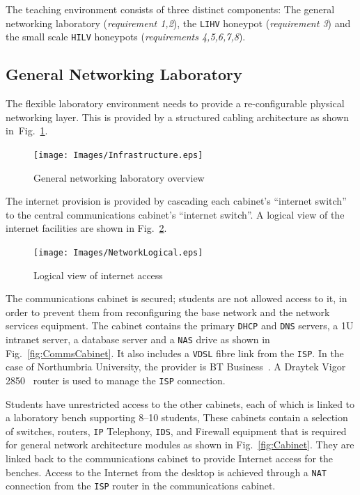 \documentclass[10pt,journal]{IEEEtran}
\begin{document}
The teaching environment consists of three distinct components: The general
networking laboratory (\textit{requirement 1,2}), the \texttt{LIHV} honeypot
(\textit{requirement 3}) and the small scale \texttt{HILV} honeypots
(\textit{requirements 4,5,6,7,8}).

\subsection{General Networking Laboratory}

The flexible laboratory environment needs to provide a re-configurable physical
networking layer. This is provided by a structured cabling architecture as
shown in~Fig.~\ref{fig:Overview1}. 

\begin{figure}[ht]
  \begin{center}
    \texttt{[image: Images/Infrastructure.eps]}
  \caption{General networking laboratory overview}
  \label{fig:Overview1}
  \end{center}
  \end{figure}  

The internet provision is provided by cascading each cabinet's ``internet switch'' to the central communications cabinet's ``internet switch''. A logical view of the internet facilities are shown in Fig.~\ref{fig:NetworkLogical}.

\begin{figure}[ht]
  \centering
  \begin{minipage}[ht]{0.45\textwidth}
    \texttt{[image: Images/NetworkLogical.eps]}
  \caption{Logical view of internet access}
  \label{fig:NetworkLogical}
  \end{minipage}
\end{figure}

The communications cabinet is secured; students are not allowed access to it,
in order to prevent them from reconfiguring the base network and the network
services equipment.  The cabinet contains the primary \texttt{DHCP} and
\texttt{DNS} servers, a 1U intranet server, a database server and a
\texttt{NAS} drive as shown in Fig.~\ref{fig:CommsCabinet}. It also includes a \texttt{VDSL} fibre link from the \texttt{ISP}. In the case of Northumbria University, the provider is BT
Business~\cite{BT:17}. A Draytek Vigor 2850~\cite{DC:17} router is used to
manage the \texttt{ISP} connection. 
  
Students have unrestricted access to the other cabinets, each of which is
linked to a laboratory bench supporting 8--10 students, These cabinets contain a selection of switches, routers, \texttt{IP} Telephony, \texttt{IDS}, and Firewall equipment that is required for general network architecture modules as shown in Fig.~\ref{fig:Cabinet}.
They are linked back to the communications cabinet to provide Internet access
for the benches. Access to the Internet from the desktop is achieved through a
\texttt{NAT} connection from the \texttt{ISP} router in the communications
cabinet. 
\end{document}
